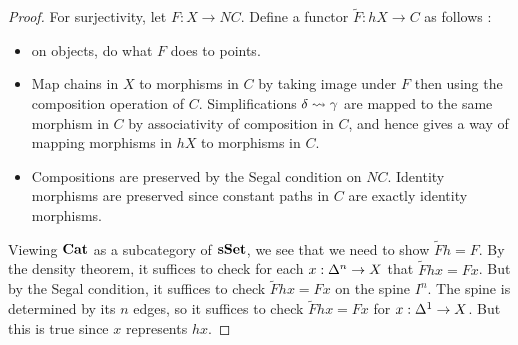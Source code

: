 \documentclass[./main.tex]{subfiles}
\begin{document}
\begin{proof}
  For surjectivity, let $F : X \to N C$.
  Define a functor $\tilde{F} : h X \to C$ as follows : 
  \begin{itemize}
    \item on objects, do what $F$ does to points.
    \item Map chains in $X$ to morphisms in $C$ by taking image under $F$ 
    then using the composition operation of $C$.
    Simplifications $\delta \rightsquigarrow \gamma$ are mapped to
    the same morphism in $C$ by associativity of composition in $C$,
    and hence gives a way of mapping morphisms in $h X$ to morphisms in $C$.
    \item Compositions are preserved by the Segal condition on $N C$.
    Identity morphisms are preserved since constant paths in $C$
    are exactly identity morphisms.
  \end{itemize}
  Viewing $\mathbf{Cat}$ as a subcategory of $\mathbf{sSet}$,
  we see that we need to show $\tilde{F} h = F$.
  By the density theorem,
  it suffices to check for each $x : \Delta^n \to X$
  that $\tilde{F} h x = F x$.
  But by the Segal condition, 
  it suffices to check $\tilde{F} h x = F x$ on the spine $I^n$.
  The spine is determined by its $n$ edges,
  so it suffices to check $\tilde{F} h x = F x$ for $x : \Delta^1 \to X$.
  But this is true since $x$ represents $h x$. 

\end{proof}
\end{document}
